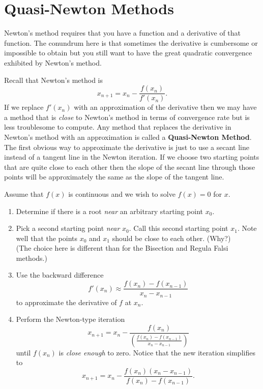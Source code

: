 

\newpage\section{Quasi-Newton Methods}
Newton's method requires that you have a function and a derivative of that function.  The
conundrum here is that sometimes the derivative is cumbersome or impossible to obtain but
you still want to have the great quadratic convergence exhibited by Newton's method.

Recall that Newton's method is
\[ x_{n+1} = x_n - \frac{f(x_n)}{f'(x_n)}. \]
If we replace $f'(x_n)$ with an approximation of the derivative then we may have a method
that is {\it close} to Newton's method in terms of convergence rate but is less
troublesome to compute. Any method that replaces the derivative in Newton's method with an
approximation is called a {\bf Quasi-Newton Method}.  The first obvious way to approximate
the derivative is just to use a secant line instead of a tangent line in the Newton
iteration.  If we choose two starting points that are quite close to each other then the
slope of the secant line through those points will be approximately the same as the slope
of the tangent line.  

\begin{algorithm}
    Assume that $f(x)$ is continuous and we wish to solve $f(x) = 0$ for $x$.
    \begin{enumerate}
        \item Determine if there is a root {\it near} an arbitrary starting point $x_0$.
        \item Pick a second starting point {\it near} $x_0$.  Call this second starting
            point $x_1$. Note well that the points $x_0$ and
            $x_1$ should be close to each other. (Why?)\\ (The choice here is different than for
            the Bisection  and Regula Falsi methods.)
        \item Use the backward difference 
            \[ f'(x_n) \approx \frac{f(x_n) - f(x_{n-1})}{x_n - x_{n-1}} \]
            to approximate the derivative of $f$ at $x_n$.
        \item Perform the Newton-type iteration 
            \[ x_{n+1} = x_n - \frac{f(x_n)}{ \left(  \frac{f(x_n) - f(x_{n-1})}{x_n - x_{n-1}}\right)} \]
            until $f(x_n)$ is {\it close enough} to zero.  Notice that the new iteration
            simplifies to
            \[ x_{n+1} = x_n - \frac{f(x_n)\left( x_n - x_{n-1} \right)}{f(x_n) -
            f(x_{n-1})}. \]
    \end{enumerate}
\end{algorithm}

